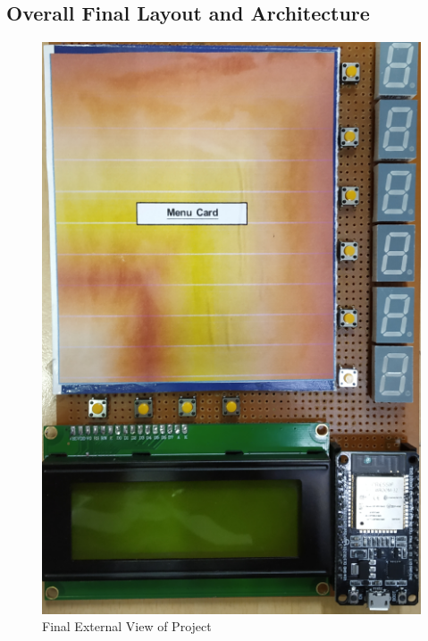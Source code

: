 \documentclass[12pt,a4paper]{article}
\begin{document}
	    \subsection{Overall Final Layout and Architecture}
	    \begin{figure}[h]
	    	\centering
	    	\caption{Final External View of Project}
	    	\includegraphics[scale=.7]{overall_layout}
	    \end{figure}
	   \newpage
\end{document}
